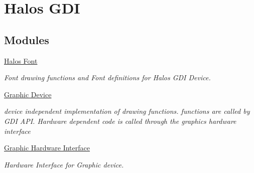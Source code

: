 \hypertarget{group___g_d_i___d_e_v_i_c_e}{
\section{Halos GDI}
\label{group___g_d_i___d_e_v_i_c_e}
}
\subsection*{Modules}
\begin{CompactItemize}
\item 
\hyperlink{group___f_o_n_t_s}{Halos Font}
\begin{CompactList}\small\item\em Font drawing functions and Font definitions for Halos GDI Device. \item\end{CompactList}

\item 
\hyperlink{group__graphic__device}{Graphic Device}
\begin{CompactList}\small\item\em device independent implementation of drawing functions. functions are called by GDI API. Hardware dependent code is called through the graphics hardware interface \item\end{CompactList}

\item 
\hyperlink{group__graphic__hw__interface}{Graphic Hardware Interface}
\begin{CompactList}\small\item\em Hardware Interface for Graphic device. \item\end{CompactList}

\end{CompactItemize}
